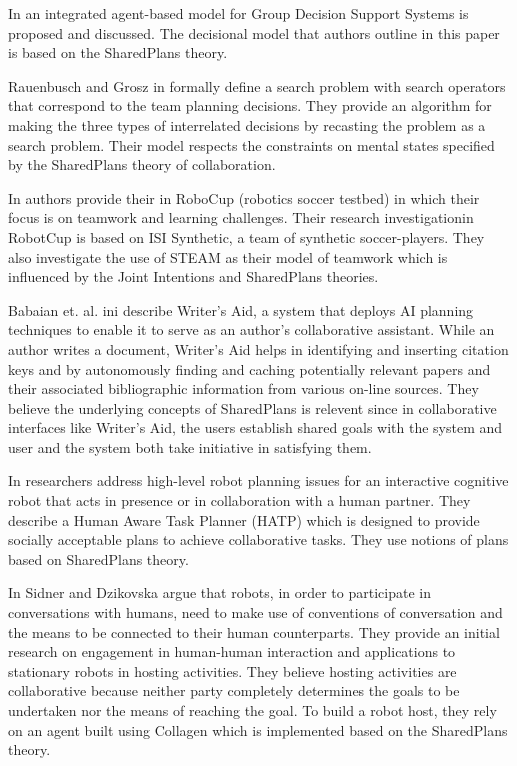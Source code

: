 \documentclass[11pt]{article}
\begin{document}
In \cite{zamfirescu:gdss} an integrated agent-based model for Group Decision
Support Systems is proposed and discussed. The decisional model that authors
outline in this paper is based on the SharedPlans theory.

Rauenbusch and Grosz in \cite{rauenbusch:decision-making-planning} formally
define a search problem with search operators that correspond to the team
planning decisions. They provide an algorithm for making the three types of
interrelated decisions by recasting the problem as a search problem. Their model
respects the constraints on mental states specified by the SharedPlans theory of
collaboration.

In \cite{marsella:robocup} authors provide their in RoboCup (robotics soccer
testbed) in which their focus is on teamwork and learning challenges. Their
research investigationin RobotCup is based on ISI Synthetic, a team of synthetic
soccer-players. They also investigate the use of STEAM as their model of
teamwork which is influenced by the Joint Intentions and SharedPlans theories.

Babaian et. al. ini \cite{babaian:writers-assistant} describe Writer’s Aid, a
system that deploys AI planning techniques to enable it to serve as an author’s
collaborative assistant. While an author writes a document, Writer’s Aid helps
in identifying and inserting citation keys and by autonomously finding and
caching potentially relevant papers and their associated bibliographic
information from various on-line sources. They believe the underlying concepts
of SharedPlans is relevent since in collaborative interfaces like Writer’s Aid,
the users establish shared goals with the system and user and the system
both take initiative in satisfying them.

In \cite{montreuil:planning-robot-activity} researchers address high-level robot
planning issues for an interactive cognitive robot that acts in presence or in
collaboration with a human partner. They describe a Human Aware Task Planner
(HATP) which is designed to provide socially acceptable plans to achieve
collaborative tasks. They use notions of plans based on SharedPlans theory.

In \cite{sidner:enagagement-robot} Sidner and Dzikovska argue that robots, in
order to participate in conversations with humans, need to make use of
conventions of conversation and the means to be connected to their human
counterparts. They provide an initial research on engagement in human-human
interaction and applications to stationary robots in hosting activities. They
believe hosting activities are collaborative because neither party completely
determines the goals to be undertaken nor the means of reaching the goal. To
build a robot host, they rely on an agent built using Collagen which is
implemented based on the SharedPlans theory.
\end{document}

